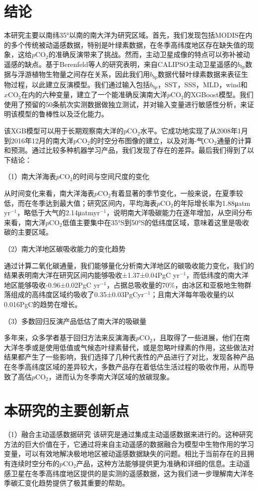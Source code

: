 \section{结论}
本研究主要以南纬35°以南的南大洋为研究区域。首先，我们发现包括MODIS在内的多个传统被动遥感数据，特别是叶绿素数据，在冬季高纬度地区存在缺失值的现象，这给$p\mathrm{CO_2}$的准确反演带来了挑战。然而，主动卫星成像的特点可以弥补被动遥感的缺点。基于Berenfeld等人\cite{bbp_Annual_2017,chen2017estimating}的研究表明，来自CALIPSO主动卫星遥感的$b_{bp}$数据与浮游植物生物量之间存在关系，因此我们用$b_{bp}$数据代替叶绿素数据来表征生物过程，以此建立反演模型。我们通过输入包括$b_{bp}$，SST，SSS，MLD，wind和$x\mathrm{CO_2}$在内的六种变量，建立了一个能准确反演南大洋$p\mathrm{CO_2}$的XGBoost模型。我们使用了预留的50条航次实测数据做独立测试，并对输入变量进行敏感性分析，来证明该模型的鲁棒性以及泛化能力。

该XGB模型可以用于长期观察南大洋的$p\mathrm{CO_2}$水平。它成功地实现了从2008年1月到2016年12月的南大洋$p\mathrm{CO_2}$的时空分布图像的建立，以及对海-气$\mathrm{CO_2}$通量的计算和预测。通过比较多种机器学习产品，我们发现了存在的差异。最后我们得到了以下结论：

（1）南大洋海表$p\mathrm{CO_2}$的时间与空间尺度的变化 

从时间变化来看，南大洋海表$p\mathrm{CO_2}$有着显著的季节变化，一般来说，在夏季较低，而在冬季达到最大值；研究区间内，平均海表$p\mathrm{CO_2}$的年际增长率为1.88μatm yr$^{-1}$，略低于大气的2.14μatmyr$^{-1}$，说明南大洋吸碳能力在逐年增加，从空间分布来看，南大洋$p\mathrm{CO_2}$低值主要集中在35°S到50°S的低纬度区域，意味着这里是吸收碳的主要区域。

（2）南大洋地区碳吸收能力的变化趋势

通过计算二氧化碳通量，我们能够量化分析南大洋地区的碳吸收能力变化，我们的结果表明南大洋在研究区间内能够吸收±1.37±0.04PgC yr$^{-1}$，而低纬度的南大洋地区能够吸收-0.96±0.02PgC yr$^{-1}$，占据总吸收量的70\%，由冰区和亚极地生物群落组成的高纬度区域约吸收了0.35±0.03PgCyr$^{-1}$；且南大洋每年吸收量约以0.016PgC的趋势在增长。

（3）多数回归反演产品低估了南大洋的吸碳量

多年来，众多学者基于回归方法来反演海表$p\mathrm{CO_2}$，且取得了一些进展，他们在南大洋冬季或是使用低值或气候态叶绿素替代，或是忽略叶绿素的作用，这些做法对结果都产生了一些影响，我们选择了几种代表性的产品进行了对比，发现各种产品在冬季高纬度区域的差异较大，多数产品存在着低估生活过程的吸收作用，从而导致了高估$p\mathrm{CO_2}$，进而认为冬季南大洋区域的放碳现象。

\section{本研究的主要创新点}
（1）融合主动遥感数据研究
该研究是通过集成主动遥感数据来进行的。这种研究方法的巨大价值在于，它通过将来自主动遥感的数据融合为模型中生物作用的学习变量，可以有效地解决极地地区被动遥感数据缺失的问题。相比于当前存在的且拥有连续时空分布的$p\mathrm{CO_2}$产品，这种方法能够提供更为准确和详细的信息。主动遥感卫星在冬季高纬度地区提供的是实测的遥感数据，这为我们进一步理解南大洋冬季碳汇变化趋势提供了极其重要的帮助。

